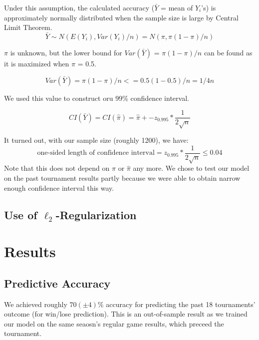 \documentclass{article} %
\begin{document}
Under this assumption, the calculated accuracy ($\bar{Y}$ = mean of $Y_i$'s) is approximately normally distributed when the sample size is large by Central Limit Theorem.
\begin{equation}
    \bar{Y} \sim N(E(Y_i), Var(Y_i)/n) = N(\pi, \pi(1-\pi)/n)
\end{equation}

$\pi$ is unknown, but the lower bound for $Var(\bar{Y})$ = $\pi(1-\pi)/n$ can be found as it is maximized when $\pi$ = 0.5.

\begin{equation}
    Var(\bar{Y}) = \pi(1-\pi)/n <= 0.5(1-0.5)/n = 1/4n
\end{equation}

We used this value to construct oru 99\% confidence interval.

\begin{equation}
    CI(\bar{Y}) = CI(\hat{\pi}) = \hat{\pi} +- z_{0.995} *  \frac{1}{2\sqrt{n}}
\end{equation}

It turned out, with our sample size (roughly 1200), we have:
\begin{equation}
    \mbox{one-sided length of confidence interval} = z_{0.995} *  \frac{1}{2\sqrt{n}} \leq 0.04
\end{equation}
Note that this does not depend on $\pi$ or $\hat{\pi}$ any more.  We chose to test our model on the past tournament results partly because we were able to obtain narrow enough confidence interval this way.



\newcommand\iid{i.i.d.}
\newcommand\pN{\mathcal{N}}



\subsection{Use of $\ell_2$-Regularization}\label{sec:l2}

\section{Results}
\subsection{Predictive Accuracy}
We achieved roughly $70(\pm4)\%$ accuracy for predicting the past 18 tournaments' outcome (for win/lose prediction).  This is an out-of-sample result as we trained our model on the same seaosn's regular game results, which preceed the tournament.
\end{document}
